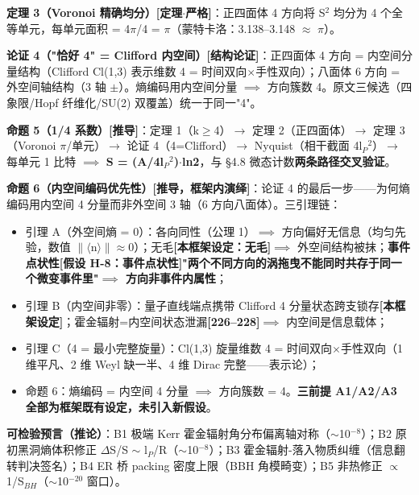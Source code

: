 \documentclass[12pt]{article}
\newcommand{\mtag}[1]{\textbf{[#1]}}
\newcommand{\up}[1]{\ensuremath{^{#1}}}
\newcommand{\down}[1]{\ensuremath{_{#1}}}
\begin{document}
\textbf{定理 3（Voronoi 精确均分）\mtag{定理\ensuremath{\cdot}严格}}：正四面体 4 方向将 S\up{2} 均分为 4 个全等单元，每单元面积 = 4\ensuremath{\pi}/4 = \ensuremath{\pi}（蒙特卡洛：3.138--3.148 \ensuremath{\approx} \ensuremath{\pi}）。

\textbf{论证 4（"恰好 4" = Clifford 内空间）\mtag{结构论证}}：正四面体 4 方向 = 内空间分量结构（Clifford Cl(1,3) 表示维数 4 = 时间双向\ensuremath{\times}手性双向）；八面体 6 方向 = 外空间轴结构（3 轴 \ensuremath{\pm}）。熵编码用内空间分量 \ensuremath{\implies} 方向簇数 4。原文三候选（四象限/Hopf 纤维化/SU(2) 双覆盖）统一于同一"4"。

\textbf{命题 5（1/4 系数）\mtag{推导}}：定理 1（k\ensuremath{\geq}4）\ensuremath{\to} 定理 2（正四面体）\ensuremath{\to} 定理 3（Voronoi \ensuremath{\pi}/单元）\ensuremath{\to} 论证 4（4=Clifford）\ensuremath{\to} Nyquist（相干截面 4l\down{P}\up{2}）\ensuremath{\to} 每单元 1 比特 \ensuremath{\implies} \textbf{S = (A/4l\down{P}\up{2})\ensuremath{\cdot}ln2}，与 \S{}4.8 微态计数\textbf{两条路径交叉验证}。

\textbf{命题 6（内空间编码优先性）\mtag{推导，框架内演绎}}：论证 4 的最后一步------为何熵编码用内空间 4 分量而非外空间 3 轴（6 方向八面体）。三引理链：
\begin{itemize}
\item 引理 A（外空间熵 = 0）：各向同性（公理 1）\ensuremath{\implies} 方向偏好无信息（均匀先验，数值 \ensuremath{\|}\ensuremath{\langle}n\ensuremath{\rangle}\ensuremath{\|}\ensuremath{\approx}0）；无毛\mtag{本框架设定：无毛}\ensuremath{\implies} 外空间结构被抹；\textbf{事件点状性\mtag{假设 H-8：事件点状性}"两个不同方向的涡拖曳不能同时共存于同一个微变事件里"\ensuremath{\implies} 方向非事件内属性}；
\item 引理 B（内空间非零）：量子直线端点携带 Clifford 4 分量状态跨支锁存\mtag{本框架设定}；霍金辐射=内空间状态泄漏\mtag{226--228}\ensuremath{\implies} 内空间是信息载体；
\item 引理 C（4 = 最小完整旋量）：Cl(1,3) 旋量维数 4 = 时间双向\ensuremath{\times}手性双向（1 维平凡、2 维 Weyl 缺一半、4 维 Dirac 完整------表示论）；
\item 命题 6：熵编码 = 内空间 4 分量 \ensuremath{\implies} 方向簇数 = 4。\textbf{三前提 A1/A2/A3 全部为框架既有设定，未引入新假设}。
\end{itemize}

\textbf{可检验预言（推论）}：B1 极端 Kerr 霍金辐射角分布偏离轴对称（\ensuremath{\sim}10\up{-8}）；B2 原初黑洞熵体积修正 \ensuremath{\Delta}S/S \ensuremath{\sim} l\down{P}/R（\ensuremath{\sim}10\up{-8}）；B3 霍金辐射-落入物质纠缠（信息翻转判决签名）；B4 ER 桥 packing 密度上限（BBH 角模畸变）；B5 非热修正 \ensuremath{\propto}1/S\down{BH}（\ensuremath{\sim}10\up{-20} 窗口）。
\end{document}

